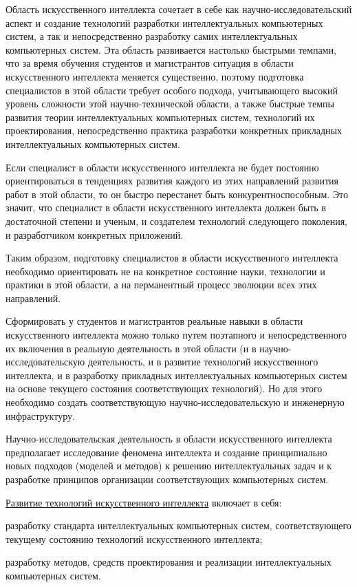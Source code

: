 \begin{SCn}
{	Область искусственного интеллекта сочетает в себе как  научно-исследовательский аспект и   создание технологий разработки интеллектуальных компьютерных систем, а так и непосредственно разработку самих интеллектуальных компьютерных систем. Эта область развивается настолько быстрыми темпами, что за время обучения студентов и магистрантов ситуация в области искусственного интеллекта меняется существенно, поэтому подготовка специалистов в этой области требует особого подхода, учитывающего высокий уровень сложности этой научно-технической области, а также быстрые темпы развития теории интеллектуальных компьютерных систем, технологий их проектирования, непосредственно практика разработки конкретных прикладных интеллектуальных компьютерных систем.
	
	Если специалист в области искусственного интеллекта не будет постоянно ориентироваться в тенденциях развития каждого из этих направлений развития работ в этой области, то он быстро перестанет быть конкурентноспособным. Это значит, что специалист в области искусственного интеллекта должен быть в достаточной степени и ученым, и создателем технологий следующего поколения, и разработчиком конкретных приложений.
	
	Таким образом, подготовку специалистов в области искусственного интеллекта необходимо ориентировать не на конкретное состояние науки, технологии и практики в этой области, а на перманентный процесс эволюции всех этих направлений.
	
	Сформировать у студентов и магистрантов реальные навыки в области искусственного интеллекта можно только путем поэтапного и непосредственного их включения в  реальную деятельность в этой области (и в научно-исследовательскую деятельность, и в развитие технологий искусственного интеллекта, и в разработку прикладных интеллектуальных компьютерных систем на основе текущего состояния соответствующих технологий). Но для этого необходимо создать соответствующую научно-исследовательскую и инженерную инфраструктуру.
	
	Научно-исследовательская деятельность  в области искусственного интеллекта предполагает исследование феномена интеллекта и создание принципиально новых подходов (моделей и методов) к решению интеллектуальных задач и к разработке принципов организации соответствующих компьютерных систем.
	
	\uline{Развитие технологий искусственного интеллекта} включает в себя:
	\begin{scnitemize}
		\item разработку стандарта интеллектуальных компьютерных систем, соответствующего текущему состоянию технологий искусственного интеллекта;
		\item разработку методов, средств проектирования и реализации интеллектуальных компьютерных систем.
	\end{scnitemize}
	
}
\end{SCn}
